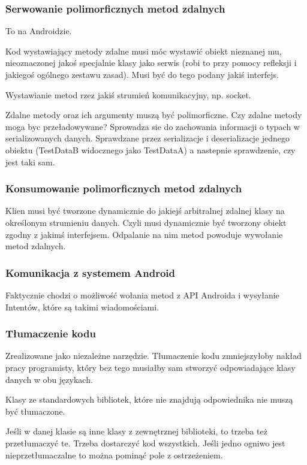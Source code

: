 \subsubsection{Serwowanie polimorficznych metod zdalnych}
To na Androidzie.

Kod wystawiający metody zdalne musi móc wystawić obiekt nieznanej mu, nieoznaczonej jakoś specjalnie klasy jako serwis (robi to przy pomocy refleksji i jakiegoś ogólnego zestawu zasad). Musi być do tego podany jakiś interfejs.

Wystawianie metod rzez jakiś strumień komunikacyjny, np. socket.


Zdalne metody oraz ich argumenty muszą być polimorficzne.
Czy zdalne metody moga byc przeładowywane?
Sprowadza sie do zachowania informacji o typach
w serializowanych danych. Sprawdzane przez serializacje
i deserializacje jednego obiektu (TestDataB widocznego
jako TestDataA) a nastepnie sprawdzenie,
czy jest taki sam.

\subsubsection{Konsumowanie polimorficznych metod zdalnych}
Klien musi być tworzone dynamicznie do jakiejś arbitralnej zdalnej klasy na określonym strumieniu danych. Czyli musi dynamicznie być tworzony obiekt zgodny z jakimś interfejsem. Odpalanie na nim metod powoduje wywołanie metod zdalnych.

\subsubsection{Komunikacja z systemem Android}
Faktycznie chodzi o możliwość wołania metod z API Androida i wysyłanie Intentów, które są takimi wiadomościami.

\subsubsection{Tłumaczenie kodu}
Zrealizowane jako niezależne narzędzie.
Tłumaczenie kodu zmniejszyłoby nakład pracy programisty, który bez tego musiałby sam stworzyć odpowiadające klasy danych w obu językach.

Klasy ze standardowych bibliotek, które nie znajdują odpowiednika nie muszą być tłumaczone.

Jeśli w danej klasie są inne klasy z zewnętrznej biblioteki, to trzeba też przetłumaczyć te. Trzeba dostarczyć kod wszystkich.
Jeśli jedno ogniwo jest nieprzetłumaczalne to można pominąć pole z ostrzeżeniem.

